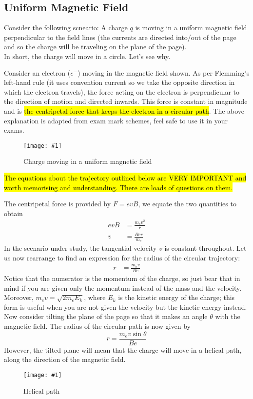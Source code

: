 \documentclass[a4paper,12pt]{article}
\newcommand{\lb}{\\[8pt]}
\newcommand{\img}[4]{\begin{center}
  \begin{figure}[H]
    \centering
    \texttt{[image: \#1]}
    \caption{#3}
    \label{fig:#4}
  \end{figure}
\end{center}}
\begin{document}
\subsection{Uniform Magnetic Field}\label{subsec:uniformmagneticfield}
Consider the following scneario: A charge $q$ is moving in a uniform magnetic field perpendicular to the field lines (the currents are directed into/out of the page and so the charge will be traveling on the plane of the page).\lb
In short, the charge will move in a circle. Let's see why.\lb

\begin{minipage}[t]
  {0.6\textwidth}
  Consider an electron ($e^-$) moving in the magnetic field shown. As per Flemming's left-hand rule (it uses convention current so we take the opposite direction in which the electron travels), the force acting on the electron is perpendicular to the direction of motion and directed inwards. This force is constant in magnitude and is \hl{the centripetal force that keeps the electron in a circular path}. The above explanation is adapted from exam mark schemes, feel safe to use it in your exams.
\end{minipage}\hspace*{0.05\textwidth}%
\begin{minipage}[t]
  {0.35\textwidth}
  \img{move2.png}{1}{Charge moving in a uniform magnetic field}{move2}
\end{minipage}

\hl{The equations about the trajectory outlined below are VERY IMPORTANT and worth memorising and understanding. There are loads of questions on them.}

\pagebreak
The centripetal force is provided by $F = evB$, we equate the two quantities to obtain
\begin{align*}
  evB & = \frac{m_ev^2}{r} \\
  v   & = \frac{Ber}{m_e}
\end{align*}
In the scenario under study, the tangential velocity $v$ is constant throughout. Let us now rearrange to find an expression for the radius of the circular trajectory:
\begin{align*}
  r & = \frac{m_ev}{Be}
\end{align*}
Notice that the numerator is the momentum of the charge, so just bear that in mind if you are given only the momentum instead of the mass and the velocity. Moreover, $m_ev  = \sqrt{2m_eE_k}$, where $E_k$ is the kinetic energy of the charge; this form is useful when you are not given the velocity but the kinetic energy instead.\lb
Now consider tilting the plane of the page so that it makes an angle $\theta$ with the magnetic field. The radius of the circular path is now given by $$r = \dfrac{m_ev\sin\theta}{Be}$$
However, the tilted plane will mean that the charge will move in a helical path,  along the direction of the magnetic field.
\img{helicalpath.png}{0.4}{Helical path}{helicalpath}
\end{document}
